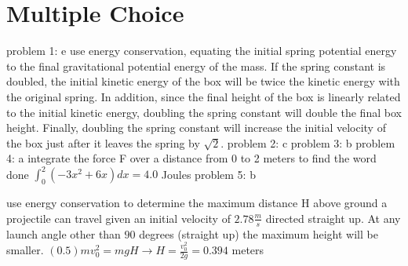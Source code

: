 \chapter{Multiple Choice}
\label{Multiple Choice}
problem 1: e 
\newline
use energy conservation, equating the initial spring potential energy to the final gravitational\newline
potential energy of the mass. If the spring constant is doubled, the initial kinetic energy of\newline
the box will be twice the kinetic energy with the original spring. In addition, since the final\newline
height of the box is linearly related to the initial kinetic energy, doubling the spring constant\newline
will double the final box height. Finally, doubling the spring constant will increase the initial\newline
velocity of the box just after it leaves the spring by $\sqrt{2}$.\newline
problem 2: c
\newline
problem 3: b
\newline
problem 4: a
\newline
integrate the force F over a distance from 0 to 2 meters to find the word done\newline
$\int_0^2 \!(-3x^{2} + 6x) dx = 4.0$ Joules\newline
problem 5: b\newline

use energy conservation to determine the maximum distance H above ground a projectile can travel\newline
given an initial velocity of $2.78 \frac{m}{s}$ directed straight up. At any launch angle other than\newline
$90$ degrees (straight up) the maximum height will be smaller.\newline
$(0.5)mv_{0}^{2} = mgH \rightarrow H = \frac{v_{0}^{2}}{2g} = 0.394$ meters\newline
